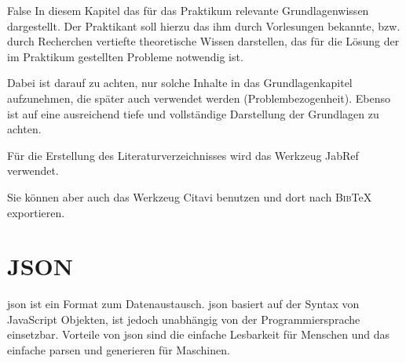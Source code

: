 \if False
In diesem Kapitel das für das Praktikum relevante Grundlagenwissen 
dargestellt. Der Praktikant soll hierzu das ihm durch Vorlesungen 
bekannte, bzw. durch Recherchen vertiefte theoretische Wissen 
darstellen, das für die Lösung der im Praktikum gestellten Probleme 
notwendig ist.

Dabei ist darauf zu achten, nur solche Inhalte in das Grundlagenkapitel 
aufzunehmen, die später auch verwendet werden (Problembezogenheit). 
Ebenso ist auf eine ausreichend tiefe und vollständige Darstellung der 
Grundlagen zu achten.

Für die Erstellung des Literaturverzeichnisses 
wird das Werkzeug JabRef\autocite{JabRef:JabRef} verwendet. 

Sie können aber auch das Werkzeug Citavi\autocite{SAS:Citavi} benutzen
und dort nach \textsc{Bib}\TeX{} exportieren.
\fi

\section{JSON}
\label{sec:json}

\ac{json} ist ein Format zum Datenaustausch.
\ac{json} basiert auf der Syntax von JavaScript Objekten, ist jedoch unabhängig von der Programmiersprache einsetzbar.
Vorteile von \ac{json} sind die einfache Lesbarkeit für Menschen und das einfache parsen und generieren für Maschinen.
~\autocite{json:json}

